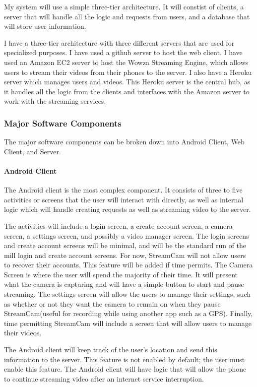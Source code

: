 \documentclass[11pt,a4paper,titlepage]{article}
\begin{document}
My system will use a simple three-tier architecture. It will constist of clients, a server that will handle all the logic and requests from users, and a database that will store user information. 

I have a three-tier architecture with three different servers that are used for specialized purposes. I have used a github server to host the web client. I have used an Amazon EC2 server to host the Wowza Streaming Engine, which allows users to stream their videos from their phones to the server. I also have a Heroku server which manages users and videos. This Heroku server is the central hub, as it handles all the logic from the clients and interfaces with the Amazon server to work with the streaming services. 

\subsubsection{Major Software Components}
The major software components can be broken down into Android Client, Web Client, and Server. 

\paragraph{Android Client\\}
    The Android client is the most complex component. It consists of three to five activities or screens that the user will interact with directly, as well as internal logic which will handle creating requests as well as streaming video to the server.
    
    The activities will include a login screen, a create account screen, a camera screen, a settings screen, and possibly a video manager screen. The login screens and create account screens will be minimal, and will be the standard run of the mill login and create account screens. For now, StreamCam will not allow users to recover their accounts. This feature will be added if time permits. The Camera Screen is where the user will spend the majority of their time. It will present what the camera is capturing and will have a simple button to start and pause streaming. The settings screen will allow the users to manage their settings, such as whether or not they want the camera to remain on when they pause StreamCam(useful for recording while using another app such as a GPS). Finally, time permitting StreamCam will include a screen that will allow users to manage their videos.
    
    
    The Android client will keep track of the user's location and send this information to the server. This feature is not enabled by default; the user must enable this feature. The Android client will have logic that will allow the phone to continue streaming video after an internet service interruption.
    
\end{document}
